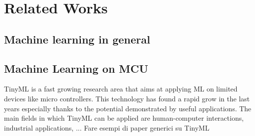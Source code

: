 \documentclass[12pt]{report}
\begin{document}



\chapter{Related Works}


\section{Machine learning in general}


\section{Machine Learning on MCU}


TinyML is a fast growing research area that aims at applying ML on limited devices like micro controllers. This technology has found a rapid grow in the last years especially thanks to the potential demonstrated by useful applications. The main fields in which TinyML can be applied are human-computer interactions, industrial applications, ... Fare esempi di paper generici su TinyML
\end{document}
